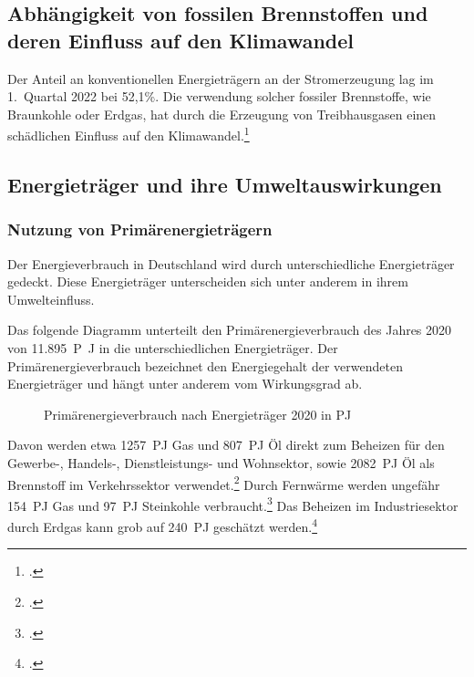 \documentclass[12pt]{article}
\begin{document}
\subsection{Abhängigkeit von fossilen Brennstoffen und deren Einfluss auf den Klimawandel}

Der Anteil an konventionellen Energieträgern an der Stromerzeugung lag im 1.\ Quartal 2022 bei 52,1\%.
Die verwendung solcher fossiler Brennstoffe, wie Braunkohle oder Erdgas, hat durch die Erzeugung von
Treibhausgasen einen schädlichen Einfluss auf den Klimawandel.\footcite{wilkeErneuerbareUndKonventionelle2013}

\subsection{Energieträger und ihre Umweltauswirkungen}

\subsubsection{Nutzung von Primärenergieträgern}

Der Energieverbrauch in Deutschland wird durch unterschiedliche Energieträger gedeckt.
Diese Energieträger unterscheiden sich unter anderem in ihrem Umwelteinfluss.

Das folgende Diagramm unterteilt den Primärenergieverbrauch des Jahres 2020 von
\qty{11.895}{P\joule}
in die unterschiedlichen Energieträger.
Der Primärenergieverbrauch bezeichnet den Energiegehalt der verwendeten Energieträger und
hängt unter anderem vom Wirkungsgrad ab.

\begin{figure}[!h]
    \caption{Primärenergieverbrauch nach Energieträger 2020 in
        \unit{PJ}}
\end{figure}

Davon werden etwa \qty{1257}{PJ} Gas und \qty{807}{PJ} Öl direkt zum Beheizen für den Gewerbe-, Handels-,
Dienstleistungs- und Wohnsektor, sowie \qty{2082}{PJ} Öl als Brennstoff im Verkehrssektor verwendet.\footcite{Energieflussbild2020PJLang}
Durch Fernwärme werden ungefähr \qty{154}{PJ} Gas und \qty{97}{PJ} Steinkohle verbraucht.\footcite{WieKannTransformation}
Das Beheizen im Industriesektor durch Erdgas kann grob auf \qty{240}{PJ} geschätzt werden.\footcite{Industrie}
\end{document}
